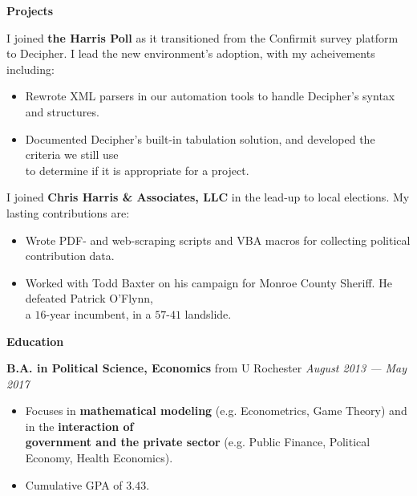 \documentclass[12pt]{article}
\newenvironment{details}{
\begin{itemize}[label={}]
	\small \setlength{\itemsep}{0pt}
}{\end{itemize}}
\begin{document}
\vspace{.2in}
\large
\textbf{Projects} \hrulefill

\small
\begin{flushleft}
	I joined \textbf{the Harris Poll} as it transitioned from the Confirmit survey platform to Decipher. I lead the new environment's adoption, with my acheivements including:
\end{flushleft}
\begin{details}
	\item Rewrote XML parsers in our automation tools to handle Decipher's syntax and structures.
	\item Documented Decipher's built-in tabulation solution, and developed the criteria we still use \\
	\hspace{.1in} to determine if it is appropriate for a project.
\end{details}

\small
\begin{flushleft}
	I joined \textbf{Chris Harris \& Associates, LLC} in the lead-up to local elections. My lasting contributions are:
\end{flushleft}
\begin{details}
	\item Wrote PDF- and web-scraping scripts and VBA macros for collecting political contribution data.
	\item Worked with Todd Baxter on his campaign for Monroe County Sheriff. He defeated Patrick O'Flynn, \\
	\hspace{.1in} a $16$-year incumbent, in a $57$-$41$ landslide.
\end{details}

\vspace{.2in}
\large
\textbf{Education} \hrulefill

\normalsize
\textbf{B.A. in Political Science, Economics} from U Rochester \hfill \textit{August 2013 --- May 2017}
\begin{details}
	\item Focuses in \textbf{mathematical modeling} (e.g. Econometrics, Game Theory) and in the \textbf{interaction of \\
	\hspace{.1in} government and the private sector} (e.g. Public Finance, Political Economy, Health Economics).
	\item Cumulative GPA of $3.43$.
\end{details}
\end{document}

